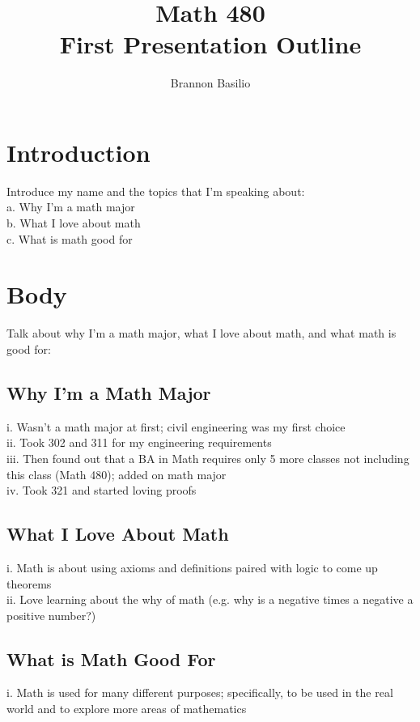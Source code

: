 \documentclass[12pt]{article}
\begin{document}
\title{Math 480\\First Presentation Outline} %
\author{Brannon Basilio} %
\date{} %
\maketitle




\section*{Introduction}
Introduce my name and the topics that I'm speaking about:\\
a.	Why I'm a math major\\
b.	What I love about math\\
c.	What is math good for





\section*{Body}
Talk about why I'm a math major, what I love about math, and what math is good for:

\subsection*{Why I'm a Math Major}
i.	Wasn't a math major at first; civil engineering was my first choice\\
ii.	Took 302 and 311 for my engineering requirements\\
iii.	Then found out that a BA in Math requires only 5 more classes not including this class (Math 
480); added on math major\\
iv.	Took 321 and started loving proofs


\subsection*{What I Love About Math}
i.	Math is about using axioms and definitions paired with logic to come up theorems\\
ii.	Love learning about the why of math (e.g. why is a negative times a negative a positive number?)




\subsection*{What is Math Good For}
i.	Math is used for many different purposes; specifically, to be used in the real world and to explore more areas of mathematics
	
\end{document}
